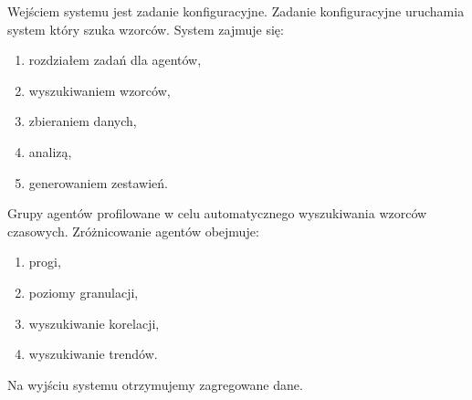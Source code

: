 \documentclass[11pt]{report}
\begin{document}
    Wejściem systemu jest zadanie konfiguracyjne.
    Zadanie konfiguracyjne uruchamia system który szuka wzorców.
    System zajmuje się:
    \begin{enumerate}
        \item rozdziałem zadań dla agentów,
        \item wyszukiwaniem wzorców,
        \item zbieraniem danych,
        \item analizą,
        \item generowaniem zestawień.
    \end{enumerate}

    Grupy agentów profilowane w celu automatycznego wyszukiwania wzorców czasowych.
    Zróżnicowanie agentów obejmuje:
    \begin{enumerate}
        \item progi,
        \item poziomy granulacji,
        \item wyszukiwanie korelacji,
        \item wyszukiwanie trendów.
    \end{enumerate}

    Na wyjściu systemu otrzymujemy zagregowane dane.
\end{document}
